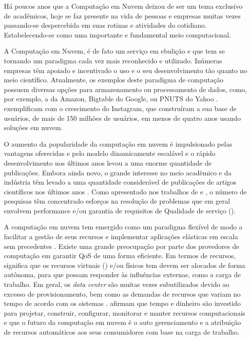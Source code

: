 Há poucos anos que a Computação em Nuvem deixou de ser um tema exclusivo de acadêmicos, hoje se faz presente na vida de pessoas e empresas muitas vezes passando-se despercebida em suas rotinas e atividades do cotidiano. Estabelecendo-se como uma importante e fundamental meio computacional. 

A Computação em Nuvem, é de fato um serviço em ebulição e que tem se tornando um paradigma cada vez mais reconhecido e utilizado. Inúmeras empresas têm apoiado e incentivado o uso e o seu desenvolvimento tão quanto no meio científico. Atualmente, os exemplos deste paradigma de computação possuem diversas opções para armazenamento ou processamento de dados, como, por exemplo, a \textit{} da Amazon, Bigtable do Google, ou PNUTS do Yahoo \cite{Binnig2009}.  exemplificam com o crescimento do Instagram, que construíram a sua base de usuários, de mais de 150 milhões de usuários, em menos de quatro anos usando soluções em nuvem.

O aumento da popularidade da computação em nuvem é impulsionado pelas vantagens oferecidas e pelo modelo dinamicamente escalável e o rápido desenvolvimento nos últimos anos levou a uma enorme quantidade de publicações. Embora ainda novo, o grande interesse no meio acadêmico e da indústria têm levado a uma quantidade considerável de publicações de artigos científicos nos últimos anos \cite{Heilig2014}. Como apresentado nos trabalhos de  e , o número de pesquisas têm concentrado esforços na resolução de problemas que em geral envolvem performance e/ou garantia de requisitos de Qualidade de serviço (\textit{}). 

A computação em nuvem tem emergido como um paradigma flexível de modo a facilitar a gestão de seus recursos e implementar aplicações elásticas em escala sem precedentes \cite{Cervino2012}. Existe uma grande preocupação por parte dos provedores de computação em garantir QoS de uma forma eficiente. Em termos de recursos, significa que os recursos virtuais (\textit{}) e/ou físicos tem devem ser alocados de forma autônoma, para que possam responder às influências externas, como a carga de trabalho. Em geral, os \textit{data center} são muitas vezes subutilizados devido ao excesso de provisionamento, bem como as demandas de recursos que variam no tempo de acordo com os sistemas \cite{Padala2007}.  afirmam que tempo e dinheiro são investido para projetar, construir, configurar, monitorar e manter recursos computacionais e que o futuro da computação em nuvem é o auto gerenciamento e a atribuição de recursos automáticos aos seus consumidores com base na carga de trabalho.

